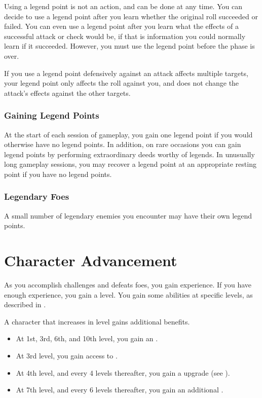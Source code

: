         Using a legend point is not an action, and can be done at any time.
        You can decide to use a legend point after you learn whether the original roll succeeded or failed.
        You can even use a legend point after you learn what the effects of a successful attack or check would be, if that is information you could normally learn if it succeeded.
        However, you must use the legend point before the phase is over.

        If you use a legend point defensively against an attack affects multiple targets, your legend point only affects the roll against you, and does not change the attack's effects against the other targets.

    \subsubsection{Gaining Legend Points}
        At the start of each session of gameplay, you gain one legend point if you would otherwise have no legend points.
        In addition, on rare occasions you can gain legend points by performing extraordinary deeds worthy of legends.
        In unusually long gameplay sessions, you may recover a legend point at an appropriate resting point if you have no legend points.

    \subsubsection{Legendary Foes}
        A small number of legendary enemies you encounter may have their own legend points.

\section{Character Advancement}\label{Character Advancement}

    As you accomplish challenges and defeats foes, you gain experience.
    If you have enough experience, you gain a level.
    You gain some abilities at specific levels, as described in .

    A character that increases in level gains additional benefits.
    \begin{itemize}
        \item At 1st, 3rd, 6th, and 10th level, you gain an .
        \item At 3rd level, you gain access to .
        \item At 4th level, and every 4 levels thereafter, you gain a  upgrade (see ).
        \item At 7th level, and every 6 levels thereafter, you gain an additional .
    \end{itemize}

